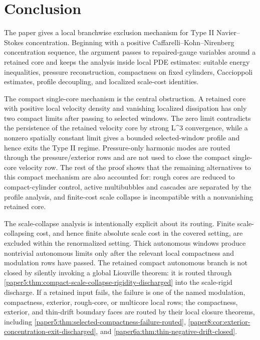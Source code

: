\documentclass[11pt]{amsart}
\def\({}%
\def\){}%
\theoremstyle{plain}
\theoremstyle{definition}
\theoremstyle{remark}
\begin{document}
\clearpage
\section{Conclusion}

The paper gives a local branchwise exclusion mechanism for Type II
Navier--Stokes concentration.  Beginning
with a positive Caffarelli--Kohn--Nirenberg concentration sequence, the argument
passes to repaired-gauge variables around a retained core and keeps the analysis
inside local PDE estimates: suitable energy inequalities, pressure
reconstruction, compactness on fixed cylinders, Caccioppoli estimates,
profile decoupling, and localized scale-cost identities.

The compact single-core mechanism is the central obstruction.  A retained core
with positive local velocity density and vanishing localized dissipation has
only two compact limits after passing to selected windows.  The zero limit
contradicts the persistence of the retained velocity core by strong \(L^3\)
convergence, while a nonzero spatially constant limit gives a bounded
selected-window profile and hence exits the Type II regime.  Pressure-only
harmonic modes are routed through the pressure/exterior rows and are not used
to close the compact single-core velocity row.  The rest
of the proof shows that the remaining alternatives to this compact
mechanism are also accounted for: rough cores are reduced to compact-cylinder
control, active multibubbles and cascades are separated by the profile
analysis, and finite-cost scale collapse is incompatible with a nonvanishing
retained core.

The scale-collapse analysis is intentionally explicit about its routing.  Finite
scale-collapsing cost, and hence finite absolute scale cost in the covered
setting, are excluded within the renormalized setting.  Thick autonomous
windows produce nontrivial autonomous limits only after the relevant local
compactness and modulation rows have passed.  The retained compact autonomous
branch is not closed by silently invoking a global Liouville theorem: it is
routed through
\cref{paper5:thm:compact-scale-collapse-rigidity-discharged} into the
scale-rigid discharge.  If a retained input fails, the failure is one of the
named modulation, compactness, exterior, rough-core, or multicore local rows;
the compactness, exterior, and thin-drift boundary faces are routed by their
local closure theorems, including
\cref{paper5:thm:selected-compactness-failure-routed},
\cref{paper8:cor:exterior-concentration-exit-discharged}, and
\cref{paper6a:thm:thin-negative-drift-closed}.
\end{document}

